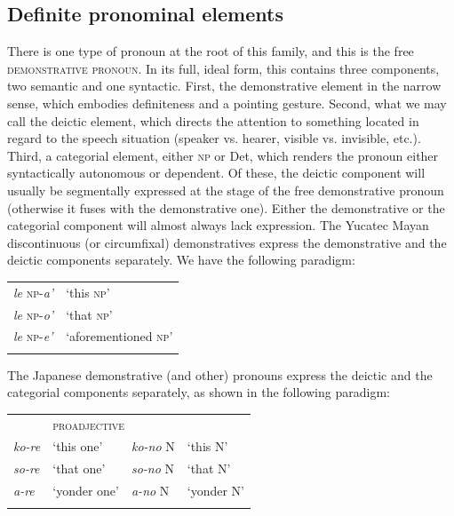 \subsection{Definite pronominal elements}

There is one type of pronoun at the root of this family, and this is the free \textsc{demonstrative pronoun}. In its full, ideal form, this contains three components, two semantic and one syntactic. First, the demonstrative element in the narrow sense, which embodies definiteness and a pointing gesture. Second, what we may call the deictic element, which directs the attention to something located in regard to the speech situation (speaker vs. hearer, visible vs. invisible, etc.). Third, a categorial element, either \textsc{np} or Det, which renders the pronoun either syntactically autonomous or dependent. Of these, the deictic component will usually be segmentally expressed at the stage of the free demonstrative pronoun (otherwise it fuses with the demonstrative one). Either the demonstrative or the categorial component will almost always lack expression. The Yucatec Mayan discontinuous (or circumfixal) demonstratives express the demonstrative and the deictic components separately. We have the following paradigm:

\begin{table}[H] %
\begin{tabular}{ll}
\lsptoprule
\textit{le} \textsc{np}-\textit{a'} & ‘this \textsc{np}’\\
\textit{le} \textsc{np}-\textit{o'} & ‘that \textsc{np}’\\
\textit{le} \textsc{np}-\textit{e'} & ‘aforementioned \textsc{np}’\\
\lspbottomrule
\end{tabular}
\end{table}

The Japanese demonstrative (and other) pronouns express the deictic and the categorial components separately, as shown in the following paradigm:

\begin{table}[H] %
\begin{tabular}{llll}
\lsptoprule
\multicolumn{2}{l}{\textsc{pronoun}} & \multicolumn{2}{l}{\textsc{proadjective}}\\
\itshape ko-re & ‘this one’ & \textit{ko-no} N & ‘this N’\\
\itshape so-re & ‘that one’ & \textit{so-no} N & ‘that N’\\
\itshape a-re & ‘yonder one’ & \textit{a-no} N & ‘yonder N’\\
\lspbottomrule
\end{tabular}
\end{table}

